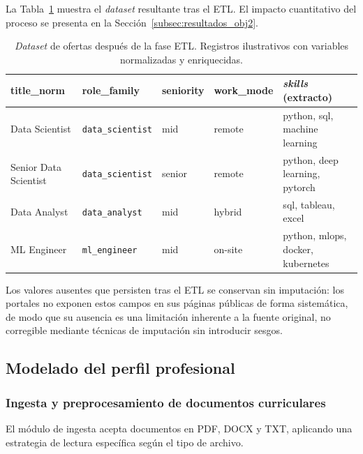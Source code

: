 La Tabla~\ref{tab:tabla3_2} muestra el \textit{dataset} resultante tras el ETL. El impacto cuantitativo del proceso se presenta en la Sección~\ref{subsec:resultados_obj2}.

\begin{table}[H]
  \caption{\textit{Dataset} de ofertas después de la fase ETL. Registros ilustrativos con variables normalizadas y enriquecidas.}
  \label{tab:tabla3_2}
  \centering
  \footnotesize
  \begin{tabular}{|p{3.0cm}|p{2.2cm}|p{1.8cm}|p{2.0cm}|p{4.5cm}|}
    \hline
    \rowcolor{gray!15}
    \textbf{title\_norm} & \textbf{role\_family} & \textbf{seniority} & \textbf{work\_mode} & \textbf{\textit{skills} (extracto)} \\
    \hline
    Data Scientist       & \texttt{data\_scientist} & mid    & remote  & python, sql, machine learning \\
    Senior Data Scientist & \texttt{data\_scientist} & senior & remote  & python, deep learning, pytorch \\
    Data Analyst         & \texttt{data\_analyst}   & mid    & hybrid  & sql, tableau, excel \\
    ML Engineer          & \texttt{ml\_engineer}    & mid    & on-site & python, mlops, docker, kubernetes \\
    \hline
  \end{tabular}
\end{table}

Los valores ausentes que persisten tras el ETL se conservan sin imputación: los portales no exponen estos campos en sus páginas públicas de forma sistemática, de modo que su ausencia es una limitación inherente a la fuente original, no corregible mediante técnicas de imputación sin introducir sesgos.

\subsection{Modelado del perfil profesional}
\label{subsec:modelado_cv}
\subsubsection{Ingesta y preprocesamiento de documentos curriculares}
\label{subsubsec:ingesta_cv}
El módulo de ingesta acepta documentos en PDF, DOCX y TXT, aplicando una estrategia de lectura específica según el tipo de archivo.

